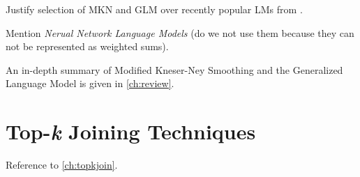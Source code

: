 \begin{draft}
\textcite{BilmesKirchhoff2003}
\end{draft}

\begin{draft}
Justify selection of MKN and GLM over recently popular LMs from
\parencite{Chelba2013}.

Mention \emph{Nerual Network Language Models} \parencite{Bengio2003,Mikolov2012}
(do we not use them because they can not be represented as weighted sums).
\end{draft}

An in-depth summary of Modified Kneser-Ney Smoothing and the Generalized
Language Model is given in \cref{ch:review}.

\section{Top-\emph{k} Joining Techniques}


\begin{draft}
Reference to \cref{ch:topkjoin}.
\end{draft}

